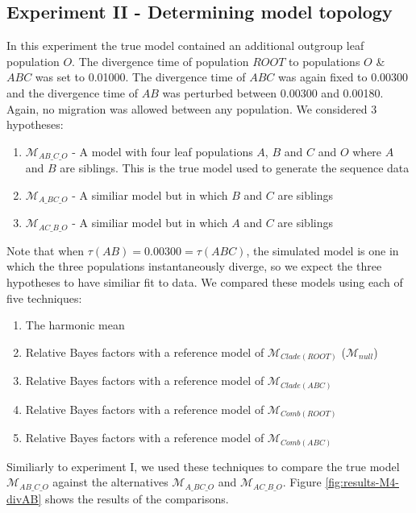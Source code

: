 \documentclass[11pt]{article}
\newcommand{\M}{\mathcal{M}}
\newcommand{\1}{\mathbbm{1}}
\begin{document}
\subsection{Experiment II - Determining model topology}
In this experiment the true model contained an additional outgroup leaf population $O$. The divergence time of population $ROOT$ to populations $O$ \& $ABC$ was set to 0.01000. The divergence time of $ABC$ was again fixed to 0.00300 and the divergence time of $AB$ was perturbed between 0.00300 and 0.00180. Again, no migration was allowed between any population. We considered 3 hypotheses:
%
\begin{enumerate}
\item $\M_{AB\_C\_O}$ - A model with four leaf populations $A$, $B$ and $C$ and $O$ where $A$ and $B$ are siblings. This is the true model used to generate the sequence data
\item $\M_{A\_BC\_O}$ - A similiar model but in which $B$ and $C$ are siblings
\item $\M_{AC\_B\_O}$ - A similiar model but in which $A$ and $C$ are siblings
\end{enumerate}
%
Note that when $\tau(AB) = 0.00300 = \tau(ABC)$, the simulated model is one in which  the three populations instantaneously diverge, so we expect the three hypotheses to have similiar fit to data. We compared these models using each of five techniques:
%
\begin{enumerate}
\item The harmonic mean
\item Relative Bayes factors with a reference model of $\M_{Clade(ROOT)}$ ($\M_{null}$)
\item Relative Bayes factors with a reference model of $\M_{Clade(ABC)}$
\item Relative Bayes factors with a reference model of $\M_{Comb(ROOT)}$
\item Relative Bayes factors with a reference model of $\M_{Comb(ABC)}$
\end{enumerate}


Similiarly to experiment I, we used these techniques to compare the true model $\M_{AB\_C\_O}$ against the alternatives $\M_{A\_BC\_O}$ and $\M_{AC\_B\_O}$. Figure \ref{fig:results-M4-divAB} shows the results of the comparisons.
\end{document}

